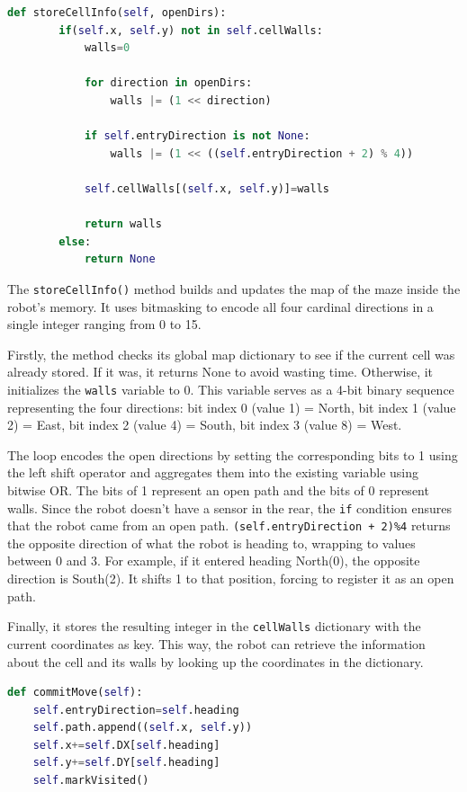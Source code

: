 \begin{lstlisting}[language=Python, caption={MazeMap cell information}, label={lst:lk-init}]
def storeCellInfo(self, openDirs):
        if(self.x, self.y) not in self.cellWalls:
            walls=0
            
            for direction in openDirs:
                walls |= (1 << direction)
                
            if self.entryDirection is not None:
                walls |= (1 << ((self.entryDirection + 2) % 4))
                    
            self.cellWalls[(self.x, self.y)]=walls
            
            return walls
        else:
            return None  
\end{lstlisting}    

The \texttt{storeCellInfo()} method builds and updates the map of the maze inside the robot's memory. It uses bitmasking to encode all four cardinal directions in a single integer ranging from 0 to 15. 

Firstly, the method checks its global map dictionary to see if the current cell was already stored. If it was, it returns None to avoid wasting time. Otherwise, it initializes the \texttt{walls} variable to 0. This variable serves as a 4-bit binary sequence representing the four directions: bit index 0 (value 1) = North, bit index 1 (value 2) = East, bit index 2 (value 4) = South, bit index 3 (value 8) = West.

The loop encodes the open directions by setting the corresponding bits to 1 using the left shift operator and aggregates them into the existing variable using bitwise OR. The bits of 1 represent an open path and the bits of 0 represent walls. Since the robot doesn't have a sensor in the rear, the \texttt{if} condition ensures that the robot came from an open path. \texttt{(self.entryDirection + 2)\%4} returns the opposite direction of what the robot is heading to, wrapping to values between 0 and 3. For example, if it entered heading North(0), the opposite direction is South(2). It shifts 1 to that position, forcing to register it as an open path.

Finally, it stores the resulting integer in the \texttt{cellWalls} dictionary with the current coordinates as key. This way, the robot can retrieve the information about the cell and its walls by looking up the coordinates in the dictionary.

\begin{lstlisting}[language=Python, caption={MazeMap commit move method}, label={lst:lk-init}]
def commitMove(self):
    self.entryDirection=self.heading
    self.path.append((self.x, self.y))
    self.x+=self.DX[self.heading]
    self.y+=self.DY[self.heading]
    self.markVisited()
\end{lstlisting}

